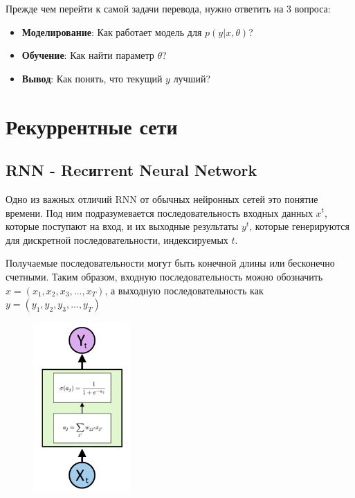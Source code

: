 \documentclass[a4paper,12pt]{article}
\begin{document}
	Прежде чем перейти к самой задачи перевода, нужно ответить на 3 вопроса:
	
	\begin{itemize}
		\item \textbf{Моделирование}: Как работает модель для $p(y|x, \theta)$?
		\item \textbf{Обучение}: Как найти параметр $\theta$?
		\item \textbf{Вывод}: Как понять, что текущий $y$ лучший?
	\end{itemize}
	
	\clearpage
	
	\section{Рекуррентные сети}
	
	\subsection{RNN - Recиrrent Neural Network}
	
	Одно из важных отличий RNN от обычных нейронных сетей это понятие времени. Под ним подразумевается последовательность входных данных $x^t$, которые поступают на вход, и их выходные результаты $y^t$, которые генерируются для дискретной последовательности, индексируемых $t$. 
	
	Получаемые последовательности могут быть конечной длины или бесконечно счетными. Таким образом, входную последовательность можно обозначить $x = (x_1, x_2, x_3, ... , x_T)$, а выходную последовательность как $y = (y_1, y_2, y_3, ... , y_T)$
	
	\begin{figure}
		\centering
		\captionsetup{justification=centering}
		\includegraphics[height=65mm]{img/1.png}
	\end{figure}
	
\end{document}
